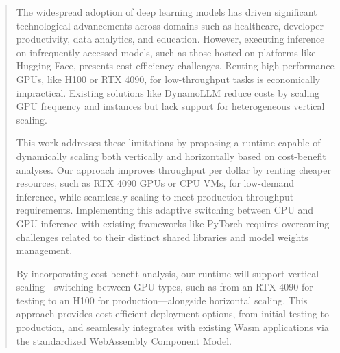 \documentclass[a4paper]{article}
\begin{document}
\setlength{\abstitleskip}{-\absparindent}
\begin{abstract}



The widespread adoption of deep learning models has driven significant technological advancements across domains such as healthcare, developer productivity, data analytics, and education. However, executing inference on infrequently accessed models, such as those hosted on platforms like Hugging Face, presents cost-efficiency challenges. Renting high-performance GPUs, like H100 or RTX 4090, for low-throughput tasks is economically impractical. Existing solutions like DynamoLLM reduce costs by scaling GPU frequency and instances but lack support for heterogeneous vertical scaling.

This work addresses these limitations by proposing a runtime capable of dynamically scaling both vertically and horizontally based on cost-benefit analyses. Our approach improves throughput per dollar by renting cheaper resources, such as RTX 4090 GPUs or CPU VMs, for low-demand inference, while seamlessly scaling to meet production throughput requirements. Implementing this adaptive switching between CPU and GPU inference with existing frameworks like PyTorch requires overcoming challenges related to their distinct shared libraries and model weights management.

By incorporating cost-benefit analysis, our runtime will support vertical scaling—switching between GPU types, such as from an RTX 4090 for testing to an H100 for production—alongside horizontal scaling. This approach provides cost-efficient deployment options, from initial testing to production, and seamlessly integrates with existing Wasm applications via the standardized WebAssembly Component Model.

\clearpage
\end{abstract}
\end{document}
